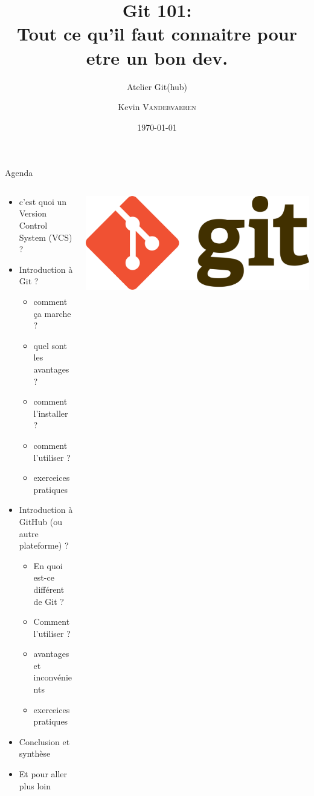\documentclass[usenames,dvipsnames]{beamer}
\title{Git 101:\\ Tout ce qu'il faut connaitre pour etre un bon dev.}
\subtitle{Atelier Git(hub)}
\date{\today}
\author{Kevin \textsc{Vandervaeren}}
\institute{ULB -- URLAB}
\begin{document}
\begin{frame}
	\titlepage
\end{frame}

\begin{frame}{Agenda}
	\begin{columns}
		\begin{column}{0.65\linewidth}
			\begin{itemize}
				\item<1-> c'est quoi un Version Control System (VCS) ?
				\item<2-> Introduction à Git ?
				\begin{itemize}
					\item comment ça marche ?
					\item quel sont les avantages ?
					\item comment l'installer ?
					\item comment l'utiliser ?
					\item exerceices pratiques
				\end{itemize}
				\item<3-> Introduction à GitHub (ou autre plateforme) ?
				\begin{itemize}
					\item En quoi est-ce différent de Git ?
					\item Comment l'utiliser ?
					\item avantages et inconvénients
					\item exerceices pratiques
				\end{itemize}
				\item<4-> Conclusion et synthèse
				\item<5-> Et pour aller plus loin
			\end{itemize}
		\end{column} %
		\begin{column}{0.3\linewidth}
			\includegraphics[width=\linewidth]{Im/Git-logo.png}
		\end{column}
	\end{columns}
\end{frame}
\end{document}
